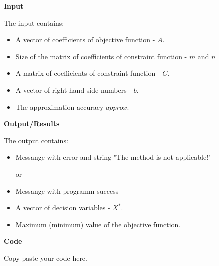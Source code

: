 \documentclass[12pt, legalpaper]{exam}
\begin{document}
\noindent     \textbf{Input}

\vspace{12pt}
The input contains:
\begin{itemize}
    \item A vector of coefficients of objective function - $A$.
    \item Size of the matrix of coefficients of constraint function - $m$ and $n$
    \item A matrix of coefficients of constraint function - $C$.
    \item A vector of right-hand side numbers - $b$.
    \item The approximation accuracy $approx$.
\end{itemize}

\vspace{12pt}
\noindent     \textbf{Output/Results}

The output contains:
\begin{itemize}
    \item Messange with error and string "The method is not applicable!"
    
or
    \item Messange with programm success
    \item A vector of decision variables - $X^*$.
    \item Maximum (minimum) value of the objective function.
\end{itemize}

\noindent
{}




\vspace{24pt}
\noindent     \textbf{Code}

Copy-paste your code here.
\end{document}
